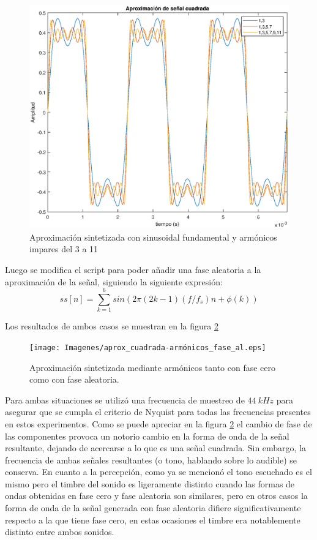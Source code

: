 \begin{enumerate}
    \begin{figure}[H]
        \centering
        \includegraphics[scale = 0.5]{Imagenes/aproximacion_sennal_cuadrada.eps}
        \caption{Aproximación sintetizada con sinusoidal fundamental y armónicos impares del 3 a 11}
        \label{sint_fase0}
    \end{figure}
    
Luego se modifica el script para poder añadir una fase aleatoria a la aproximación de la señal, siguiendo la siguiente expresión:
    $$ ss[n] = \sum^6_{k=1} sin(2\pi (2k-1)(f/f_s)n + \phi (k))$$


Los resultados de ambos casos se muestran en la figura \ref{sintetizadas}

\begin{figure}[H]
    \centering
    \texttt{[image: Imagenes/aprox\_cuadrada-armónicos\_fase\_al.eps]}
    \caption{Aproximación sintetizada mediante armónicos tanto con fase cero como con fase aleatoria.}
    \label{sintetizadas}
\end{figure}
    
    
    Para ambas situaciones se utilizó una frecuencia de muestreo de $44~kHz$ para asegurar que se cumpla el criterio de Nyquist para todas las frecuencias presentes en estos experimentos. 
    \newline
    Como se puede apreciar en la figura \ref{sintetizadas} el cambio de fase de las componentes provoca un notorio cambio en la forma de onda de la señal resultante, dejando de acercarse a lo que es una señal cuadrada. Sin embargo,  la frecuencia de ambas señales resultantes (o tono, hablando sobre lo audible) se conserva. 
    En cuanto a la percepción, como ya se mencionó el tono escuchado es el mismo pero el timbre del sonido es ligeramente distinto cuando las formas de ondas obtenidas en fase cero y fase aleatoria son similares, pero en otros casos la forma de onda de la señal generada con fase aleatoria difiere significativamente respecto a la que tiene fase cero, en estas ocasiones el timbre era notablemente distinto entre ambos sonidos.
    

\end{enumerate}
